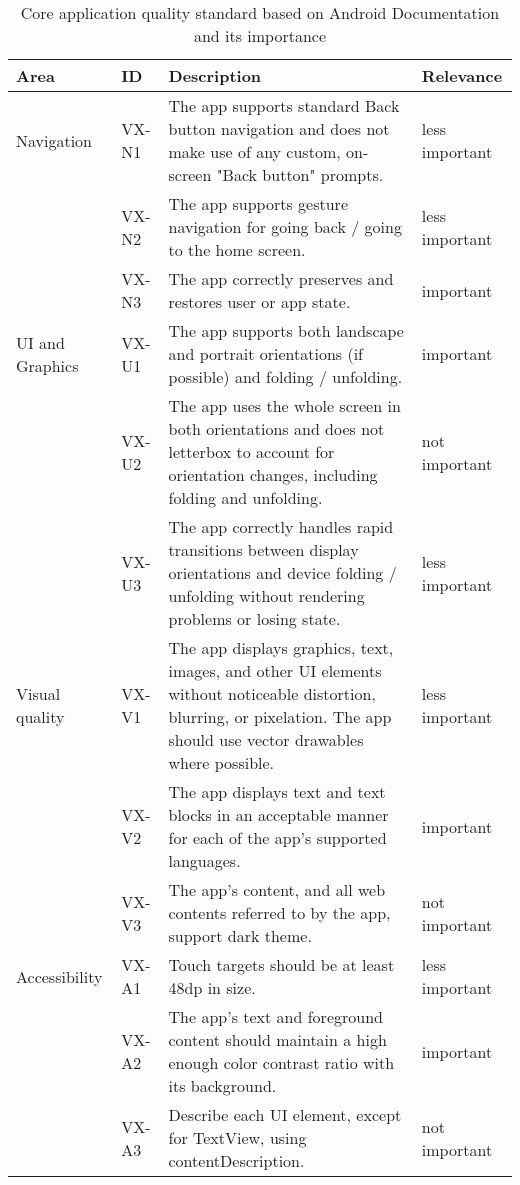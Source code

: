 \label{tab::qualitystandard}

\begin{longtable}{p{} p{} p{} p{}}

    \caption{Core application quality standard based on Android Documentation \autocite{androidqualityguidelines} and its importance}\\

        \hline
        \textbf{Area} & \textbf{ID} & \textbf{Description} & \textbf{Relevance} \\
        \hline
        Navigation & VX-N1 & The app supports standard Back button navigation and does not make use of any custom, on-screen "Back button" prompts. & less important \\
         & VX-N2 & The app supports gesture navigation for going back / going to the home screen. & less important \\
         & VX-N3 & The app correctly preserves and restores user or app state. & important \\
  
        UI and Graphics & VX-U1 & The app supports both landscape and portrait orientations (if possible) and folding / unfolding. & important \\
         & VX-U2 & The app uses the whole screen in both orientations and does not letterbox to account for orientation changes, including folding and unfolding. & not important \\
         & VX-U3 & The app correctly handles rapid transitions between display orientations and device folding / unfolding without rendering problems or losing state. & less important \\
  
        Visual quality & VX-V1 & The app displays graphics, text, images, and other UI elements without noticeable distortion, blurring, or pixelation. The app should use vector drawables where possible. & less important \\
         & VX-V2 & The app displays text and text blocks in an acceptable manner for each of the app's supported languages. & important \\
         & VX-V3 & The app's content, and all web contents referred to by the app, support dark theme. & not important \\
        Accessibility & VX-A1 & Touch targets should be at least 48dp in size. & less important \\
         & VX-A2 & The app's text and foreground content should maintain a high enough color contrast ratio with its background. & important \\
         & VX-A3 & Describe each UI element, except for TextView, using contentDescription. & not important \\
  

\end{longtable}
